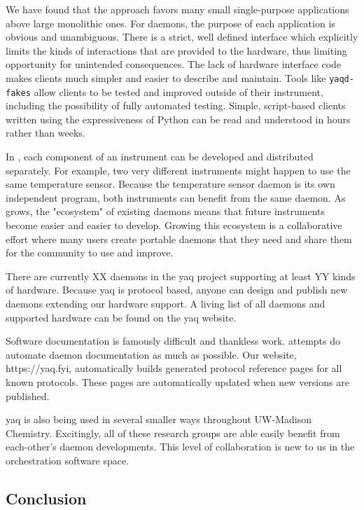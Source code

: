 We have found that the \yaq{} approach favors many small single-purpose applications above large monolithic ones.
For daemons, the purpose of each application is obvious and unambiguous. 
There is a strict, well defined interface which explicitly limits the kinds of interactions that are provided to the hardware, thus limiting opportunity for unintended consequences.
The lack of hardware interface code makes \yaq{} clients much simpler and easier to describe and maintain.
Tools like \texttt{yaqd-fakes} allow clients to be tested and improved outside of their instrument, including the possibility of fully automated testing\cite{yaqd-fakes}.
Simple, script-based clients written using the expressiveness of Python can be read and understood in hours rather than weeks.

In \yaq{}, each component of an instrument can be developed and distributed separately.
For example, two very different instruments might happen to use the same temperature sensor.
Because the temperature sensor daemon is its own independent program, both instruments can benefit from the same daemon.
As \yaq{} grows, the "ecosystem" of existing daemons means that future instruments become easier and easier to develop.
Growing this ecosystem is a collaborative effort where many \yaq{} users create portable daemons that they need and share them for the community to use and improve.

There are currently XX daemons in the yaq project supporting at least YY kinds of hardware.
Because yaq is protocol based, anyone can design and publish new daemons extending our hardware support.
A living list of all daemons and supported hardware can be found on the yaq website.

Software documentation is famously difficult and thankless work.
\yaq{} attempts do automate daemon documentation as much as possible.
Our website, https://yaq.fyi, automatically builds generated protocol reference pages for all known protocols.
These pages are automatically updated when new versions are published.

yaq is also being used in several smaller ways throughout UW-Madison Chemistry.
Excitingly, all of these research groups are able easily benefit from each-other's daemon developments.
This level of collaboration is new to us in the orchestration software space.

\subsection{Conclusion}

